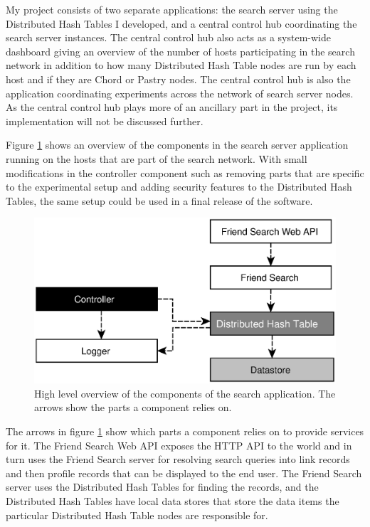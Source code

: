 \mbox{}

My project consists of two separate applications: the search server using the Distributed Hash Tables I developed, and a central control hub coordinating the search server instances.
The central control hub also acts as a system-wide dashboard giving an overview of the number of hosts participating in the search network in addition to how many Distributed Hash Table nodes are run by each host and if they are Chord or Pastry nodes. The central control hub is also the application coordinating experiments across the network of search server nodes.
As the central control hub plays more of an ancillary part in the project, its implementation will not be discussed further.

Figure \ref{figComponents} shows an overview of the components in the search server application running on the hosts that are part of the search network. With small modifications in the controller component such as removing parts that are specific to the experimental setup and adding security features to the Distributed Hash Tables, the same setup could be used in a final release of the software.

\begin{figure}[!htb]
\begin{center}
	\includegraphics[width=0.9\linewidth]{illustrations/ComponentOverview.eps}
\caption{High level overview of the components of the search application. The arrows show the parts a component relies on.}
\label{figComponents}
\end{center}
\end{figure}

The arrows in figure \ref{figComponents} show which parts a component relies on to provide services for it. The Friend Search Web API exposes the HTTP API to the world and in turn uses the Friend Search server for resolving search queries into link records and then profile records that can be displayed to the end user. The Friend Search server uses the Distributed Hash Tables for finding the records, and the Distributed Hash Tables have local data stores that store the data items the particular Distributed Hash Table nodes are responsible for.

